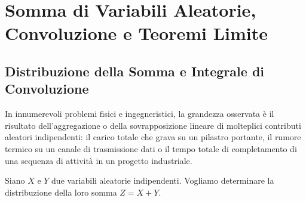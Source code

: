 \chapter{Somma di Variabili Aleatorie, Convoluzione e Teoremi Limite}
\label{cap:somma_variabili_indipendenti}

\begin{abstract}
Il presente capitolo costituisce il ponte analitico fondamentale che connette la teoria della probabilità alla statistica inferenziale. Si analizza la distribuzione della somma di variabili aleatorie indipendenti attraverso l'operatore matematico di convoluzione continua e discreta, esaminando le proprietà di stabilità e riproduttività delle famiglie parametriche notevoli. Vengono enunciati e dimostrati i grandi teoremi asintotici del calcolo delle probabilità: la Legge Debole dei Grandi Numeri (WLLN di Khinchin) mediante la disuguaglianza di Chebyshev, la Legge Forte (SLLN di Kolmogorov) e il monumentale Teorema del Limite Centrale (CLT di Lindeberg-Lévy). Infine, si approfondisce l'approssimazione normale della Binomiale di De Moivre-Laplace, illustrando la correzione geometrica di continuità di Yates.
\end{abstract}

\section{Distribuzione della Somma e Integrale di Convoluzione}
\label{sec:convoluzione_somma}

In innumerevoli problemi fisici e ingegneristici, la grandezza osservata è il risultato dell'aggregazione o della sovrapposizione lineare di molteplici contributi aleatori indipendenti: il carico totale che grava su un pilastro portante, il rumore termico su un canale di trasmissione dati o il tempo totale di completamento di una sequenza di attività in un progetto industriale.

Siano $X$ e $Y$ due variabili aleatorie indipendenti. Vogliamo determinare la distribuzione della loro somma $Z = X + Y$.

